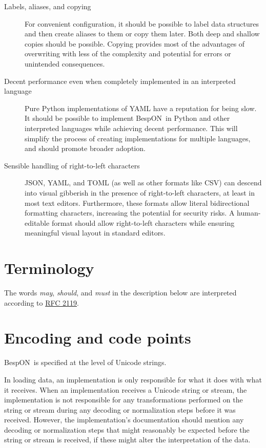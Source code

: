 \documentclass[11pt]{article}
\newcommand{\bespon}{BespON}
\begin{document}
\begin{description}
\item[Labels, aliases, and copying]  For convenient configuration, it should be possible to label data structures and then create aliases to them or copy them later.  Both deep and shallow copies should be possible.  Copying provides most of the advantages of overwriting with less of the complexity and potential for errors or unintended consequences.

\item[Decent performance even when completely implemented in an interpreted language]  Pure Python implementations of YAML have a reputation for being slow.  It should be possible to implement \bespon\ in Python and other interpreted languages while achieving decent performance.  This will simplify the process of creating implementations for multiple languages, and should promote broader adoption.

\item[Sensible handling of right-to-left characters]  JSON, YAML, and TOML (as well as other formats like CSV) can descend into visual gibberish in the presence of right-to-left characters, at least in most text editors.  Furthermore, these formats allow literal bidirectional formatting characters, increasing the potential for security risks.  A human-editable format should allow right-to-left characters while ensuring meaningful visual layout in standard editors.
\end{description}




\section{Terminology}

The words \textit{may}, \textit{should}, and \textit{must} in the description below are interpreted according to \href{http://www.ietf.org/rfc/rfc2119.txt}{RFC 2119}.




\section{Encoding and code points}

\bespon\ is specified at the level of Unicode strings.

In loading data, an implementation is only responsible for what it does with what it receives.  When an implementation receives a Unicode string or stream, the implementation is not responsible for any transformations performed on the string or stream during any decoding or normalization steps before it was received.  However, the implementation's documentation should mention any decoding or normalization steps that might reasonably be expected before the string or stream is received, if these might alter the interpretation of the data.
\end{document}
